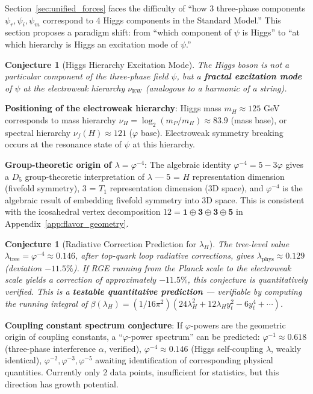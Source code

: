 \documentclass[12pt,a4paper,twocolumn]{article}
\renewcommand{\phi}{\varphi}
\newtheorem{conjecture}[theorem]{Conjecture}
\begin{document}
Section~\ref{sec:unified_forces} faces the difficulty of ``how 3 three-phase components $\psi_r, \psi_i, \psi_m$ correspond to 4 Higgs components in the Standard Model.'' This section proposes a paradigm shift: from ``which component of $\psi$ is Higgs'' to ``at which hierarchy is Higgs an excitation mode of $\psi$.''

\begin{conjecture}[Higgs Hierarchy Excitation Mode]
\label{conj:higgs_excitation}
The Higgs boson is not a particular component of the three-phase field $\psi$, but a \textbf{fractal excitation mode} of $\psi$ at the electroweak hierarchy $\nu_{\text{EW}}$ (analogous to a harmonic of a string).
\end{conjecture}

\textbf{Positioning of the electroweak hierarchy}: Higgs mass $m_H \approx 125$ GeV corresponds to mass hierarchy $\nu_H = \log_2(m_P/m_H) \approx 83.9$ (mass base), or spectral hierarchy $\nu_f(H) \approx 121$ ($\phi$ base). Electroweak symmetry breaking occurs at the resonance state of $\psi$ at this hierarchy.

\textbf{Group-theoretic origin of $\lambda = \phi^{-4}$}: The algebraic identity $\phi^{-4} = 5 - 3\phi$ gives a $D_5$ group-theoretic interpretation of $\lambda$ --- 5 = $H$ representation dimension (fivefold symmetry), 3 = $T_1$ representation dimension (3D space), and $\phi^{-4}$ is the algebraic result of embedding fivefold symmetry into 3D space. This is consistent with the icosahedral vertex decomposition $12 = \mathbf{1} \oplus \mathbf{3} \oplus \mathbf{3} \oplus \mathbf{5}$ in Appendix~\ref{app:flavor_geometry}.

\begin{conjecture}[Radiative Correction Prediction for $\lambda_H$]
\label{conj:lambda_radiation}
The tree-level value $\lambda_{\text{tree}} = \phi^{-4} \approx 0.146$, after top-quark loop radiative corrections, gives $\lambda_{\text{phys}} \approx 0.129$ (deviation $-11.5\%$). If RGE running from the Planck scale to the electroweak scale yields a correction of approximately $-11.5\%$, this conjecture is quantitatively verified. This is a \textbf{testable quantitative prediction} --- verifiable by computing the running integral of $\beta(\lambda_H) = (1/16\pi^2)(24\lambda_H^2 + 12\lambda_H y_t^2 - 6y_t^4 + \cdots)$.
\end{conjecture}

\textbf{Coupling constant spectrum conjecture}: If $\phi$-powers are the geometric origin of coupling constants, a ``$\phi$-power spectrum'' can be predicted: $\phi^{-1} \approx 0.618$ (three-phase interference $\alpha$, verified), $\phi^{-4} \approx 0.146$ (Higgs self-coupling $\lambda$, weakly identical), $\phi^{-2}, \phi^{-3}, \phi^{-5}$ awaiting identification of corresponding physical quantities. Currently only 2 data points, insufficient for statistics, but this direction has growth potential.
\end{document}
